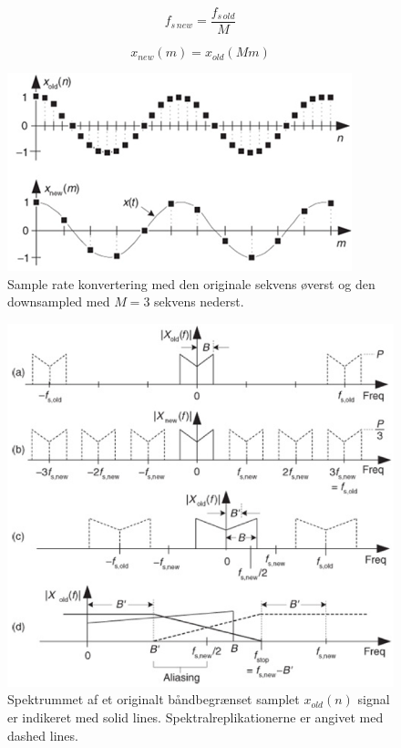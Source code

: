 \documentclass[danish]{article}
\begin{document}
\begin{equation}
f_{s\, new} = \frac{f_{s\, old}}{M}
\end{equation}

\begin{equation}
x_{new}(m) = x_{old}(Mm)
\end{equation}

\begin{figure}[H]
	\centering
	\includegraphics[width=0.6\linewidth]{graphics/decimation}
	\caption{Sample rate konvertering med den originale sekvens øverst og den downsampled med $M = 3$ sekvens nederst.}
	\label{fig:decimation}
\end{figure}

\begin{figure}[H]
	\centering
	\includegraphics[width=0.6\linewidth]{graphics/decimation1}
	\caption{Spektrummet af et originalt båndbegrænset samplet $x_{old}(n)$ signal er indikeret med solid lines. Spektralreplikationerne er angivet med dashed lines.}
	\label{fig:decimation1}
\end{figure}
\end{document}
